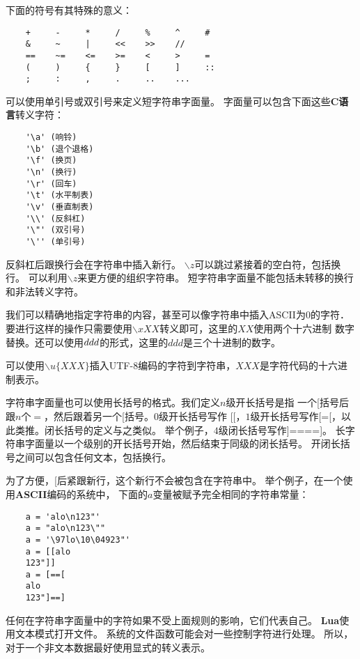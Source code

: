 \documentclass{ctexart}
\begin{document}
下面的符号有其特殊的意义：

\lstset{language=C}
\begin{lstlisting}
	+     -     *     /     %     ^     #
	&     ~     |     <<    >>    //
	==    ~=    <=    >=    <     >     =
	(     )     {     }     [     ]     ::
	;     :     ,     .     ..    ...
\end{lstlisting}

可以使用单引号或双引号来定义短字符串字面量。
字面量可以包含下面这些\textbf{C语言}转义字符：

\lstset{language=C}
\begin{lstlisting}
	'\a' (响铃)
	'\b' (退个退格)
	'\f' (换页)
	'\n' (换行)
	'\r' (回车)
	'\t' (水平制表)
	'\v' (垂直制表)
	'\\' (反斜杠)
	'\"' (双引号)
	'\'' (单引号)
\end{lstlisting}

反斜杠后跟换行会在字符串中插入新行。
$\backslash z$可以跳过紧接着的空白符，包括换行。
可以利用$\backslash z$来更方便的组织字符串。
短字符串字面量不能包括未转移的换行和非法转义字符。

我们可以精确地指定字符串的内容，甚至可以像字符串中插入ASCII为0的字符．
要进行这样的操作只需要使用$\backslash xXX$转义即可，这里的$XX$使用两个十六进制
数字替换。还可以使用$\\ddd$的形式，这里的$ddd$是三个十进制的数字。

可以使用$\backslash u\{XXX\}$插入UTF-8编码的字符到字符串，$XXX$是字符代码的十六进制表示。

字符串字面量也可以使用长括号的格式。我们定义$n$级开长括号是指
一个[括号后跟$n$个$=$，然后跟着另一个[括号。$0$级开长括号写作
[[，$1$级开长括号写作[=[，以此类推。闭长括号的定义与之类似。
举个例子，$4$级闭长括号写作]====]。
长字符串字面量以一个级别的开长括号开始，然后结束于同级的闭长括号。
开闭长括号之间可以包含任何文本，包括换行。

为了方便，[后紧跟新行，这个新行不会被包含在字符串中。
举个例子，在一个使用\textbf{ASCII}编码的系统中，
下面的$a$变量被赋予完全相同的字符串常量：

\lstset{language=C}
\begin{lstlisting}
	a = 'alo\n123"'
	a = "alo\n123\""
	a = '\97lo\10\04923"'
	a = [[alo
	123"]]
	a = [==[
	alo
	123"]==]
\end{lstlisting}

任何在字符串字面量中的字符如果不受上面规则的影响，它们代表自己。
\textbf{Lua}使用文本模式打开文件。
系统的文件函数可能会对一些控制字符进行处理。
所以，对于一个非文本数据最好使用显式的转义表示。
\end{document}
